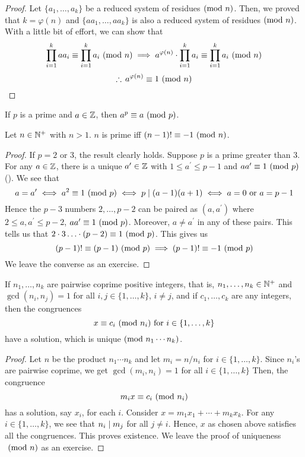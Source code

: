\begin{proof}
    Let $\{a_1, \ldots, a_k\}$ be a reduced system of residues$\ (\mathrm{mod}\ n)$. Then, we proved that $k = \varphi(n)$ and $\{aa_1, \ldots, aa_k\}$ is also a reduced system of residues$\ (\mathrm{mod}\ n)$. With a little bit of effort, we can show that
    \[
        \prod_{i=1}^k aa_i \equiv \prod_{i=1}^k a_i \ (\mathrm{mod}\ n) \implies a^{\varphi(n)} \cdot \prod_{i=1}^k a_i \equiv \prod_{i=1}^{k} a_i \ (\mathrm{mod}\ n)
    \]
    \[
        \therefore \, a^{\varphi(n)} \equiv 1 \ (\mathrm{mod}\ n) \qedhere
    \]
\end{proof}
\begin{cor} \label{thm:fermat-little}
    If $p$ is a prime and $a \in \mathbb{Z}$, then $a^p \equiv a \ (\mathrm{mod}\ p)$.
\end{cor}

\begin{theorem} \label{thm:wilson}
    Let $n \in \mathbb{N}^+$ with $n > 1$. $n$ is prime iff $(n-1)! \equiv -1 \ (\mathrm{mod}\ n)$.
\end{theorem}
\begin{proof}
    If $p = 2$ or $3$, the result clearly holds. Suppose $p$ is a prime greater than $3$. For any $a \in \mathbb{Z}$, there is a unique $a^{\prime} \in \mathbb{Z}$ with $1 \leq a^{\prime} \leq p-1$ and $aa^{\prime} \equiv 1 \ (\mathrm{mod}\ p)$ (). We see that
    \[
        a = a^{\prime} \iff a^2 \equiv 1 \ (\mathrm{mod}\ p) \iff p \mid (a-1)(a+1) \iff a = 0 \text{ or } a = p-1
    \]
    Hence the $p-3$ numbers $2,\ldots,p-2$ can be paired as $(a,a^{\prime})$ where $2 \leq a,a^{\prime} \leq p-2$, $aa^{\prime} \equiv 1 \ (\mathrm{mod}\ p)$. Moreover, $a \neq a^{\prime}$ in any of these pairs. This tells us that $2\cdot3\ldots\cdot(p-2) \equiv 1 \ (\mathrm{mod}\ p)$. This gives us
    \[
        (p-1)! \equiv (p-1) \ (\mathrm{mod}\ p) \implies (p-1)! \equiv -1 \ (\mathrm{mod}\ p)
    \]
    We leave the converse as an exercise.
\end{proof}

\begin{theorem} \label{thm:crt}
    If $n_1, \ldots, n_k$ are pairwise coprime positive integers, that is, $n_1, \ldots, n_k \in \mathbb{N}^+$ and $\gcd(n_i, n_j) = 1$ for all $i,j \in \{1, \ldots, k\}$, $i \neq j$, and if $c_1, \ldots, c_k$ are any integers, then the congruences
    \[
        x \equiv c_i \ (\mathrm{mod}\ n_i) \text{ for } i \in \{1, \ldots, k\}
    \]
    have a solution, which is unique$\ (\mathrm{mod}\ n_1\cdots n_k)$.
\end{theorem}
\begin{proof}
    Let $n$ be the product $n_1 \cdots n_k$ and let $m_i = n/n_i$ for $i \in \{1, \ldots, k\}$. Since $n_i$'s are pairwise coprime, we get $\gcd(m_i, n_i) = 1$ for all $i \in \{1, \ldots, k\}$ Then, the congruence
    \[
        m_i x \equiv c_i \ (\mathrm{mod}\ n_i)
    \]  
    has a solution, say $x_i$, for each $i$. Consider $x = m_1x_1 + \cdots + m_kx_k$. For any $i \in \{1, \ldots, k\}$, we see that $n_i \mid m_j$ for all $j \neq i$. Hence, $x$ as chosen above satisfies all the congruences. This proves existence. We leave the proof of uniqueness$\ (\mathrm{mod}\ n)$ as an exercise.
\end{proof}